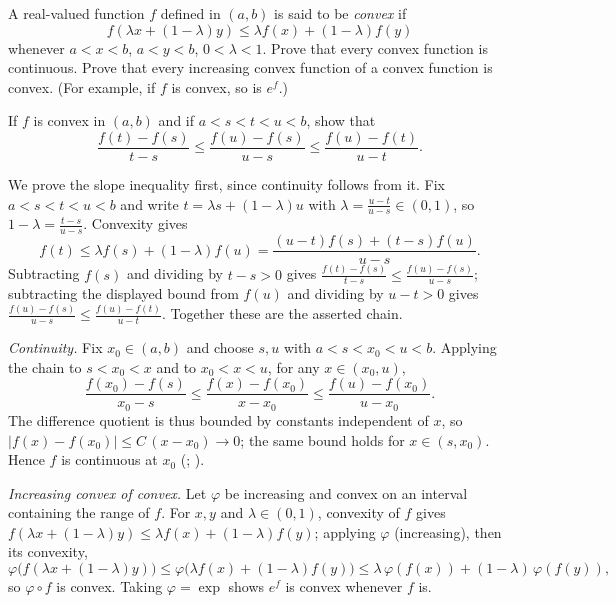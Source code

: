 \documentclass[main.tex]{subfiles}
\begin{document}
A real-valued function $f$ defined in $(a, b)$ is said to be \textit{convex} if
\[
f(\lambda x + (1 - \lambda) y) \leq \lambda f(x) + (1 - \lambda) f(y)
\]
whenever $a < x < b$, $a < y < b$, $0 < \lambda < 1$. Prove that every convex function is continuous. Prove that every increasing convex function of a convex function is convex. (For example, if $f$ is convex, so is $e^{f}$.)

If $f$ is convex in $(a, b)$ and if $a < s < t < u < b$, show that
\[
\frac{f(t) - f(s)}{t - s} \leq \frac{f(u) - f(s)}{u - s} \leq \frac{f(u) - f(t)}{u - t}.
\]
\begin{SolutionBlue}
We prove the slope inequality first, since continuity follows from it. Fix $a < s < t < u < b$ and write $t = \lambda s + (1 - \lambda) u$ with $\lambda = \frac{u - t}{u - s} \in (0, 1)$, so $1 - \lambda = \frac{t - s}{u - s}$. Convexity gives
\[
f(t) \le \lambda f(s) + (1 - \lambda) f(u) = \frac{(u - t) f(s) + (t - s) f(u)}{u - s}.
\]
Subtracting $f(s)$ and dividing by $t - s > 0$ gives $\frac{f(t) - f(s)}{t - s} \le \frac{f(u) - f(s)}{u - s}$; subtracting the displayed bound from $f(u)$ and dividing by $u - t > 0$ gives $\frac{f(u) - f(s)}{u - s} \le \frac{f(u) - f(t)}{u - t}$. Together these are the asserted chain.

\emph{Continuity.} Fix $x_{0} \in (a, b)$ and choose $s, u$ with $a < s < x_{0} < u < b$. Applying the chain to $s < x_{0} < x$ and to $x_{0} < x < u$, for any $x \in (x_{0}, u)$,
\[
\frac{f(x_{0}) - f(s)}{x_{0} - s} \le \frac{f(x) - f(x_{0})}{x - x_{0}} \le \frac{f(u) - f(x_{0})}{u - x_{0}}.
\]
The difference quotient is thus bounded by constants independent of $x$, so $|f(x) - f(x_{0})| \le C\,(x - x_{0}) \to 0$; the same bound holds for $x \in (s, x_{0})$. Hence $f$ is continuous at $x_{0}$ (; ).

\emph{Increasing convex of convex.} Let $\varphi$ be increasing and convex on an interval containing the range of $f$. For $x, y$ and $\lambda \in (0, 1)$, convexity of $f$ gives $f(\lambda x + (1 - \lambda) y) \le \lambda f(x) + (1 - \lambda) f(y)$; applying $\varphi$ (increasing), then its convexity,
\[
\varphi\big(f(\lambda x + (1 - \lambda) y)\big) \le \varphi\big(\lambda f(x) + (1 - \lambda) f(y)\big) \le \lambda\, \varphi(f(x)) + (1 - \lambda)\, \varphi(f(y)),
\]
so $\varphi \circ f$ is convex. Taking $\varphi = \exp$ shows $e^{f}$ is convex whenever $f$ is.
\end{SolutionBlue}
\end{document}
